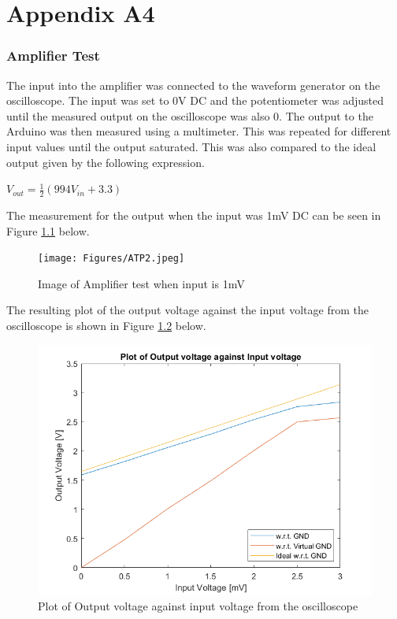 \documentclass[class=report,11pt,crop=false]{standalone}
\begin{document}
	\chapter{Appendix A4}
	\subsection{Amplifier Test}
	The input into the amplifier was connected to the waveform generator on the oscilloscope. The input was set to 0V DC and the potentiometer was adjusted until the measured output on the oscilloscope was also 0. The output to the Arduino was then measured using a multimeter. This was repeated for different input values until the output saturated. This was also compared to the ideal output given by the following expression.
	\begin{center}
		$V_{out}=\frac{1}{2}\left(994V_{in} + 3.3\right)$ \\
	\end{center}
	
	The measurement for the output when the input was 1mV DC can be seen in Figure \ref{fig:S8} below. 
	\begin{figure}[h!]
		\centering
		\texttt{[image: Figures/ATP2.jpeg]}
		\caption{Image of Amplifier test when input is 1mV}
		\label{fig:S8}
	\end{figure}
	
	The resulting plot of the output voltage against the input voltage from the oscilloscope is shown in Figure \ref{fig:S11} below.
	\begin{figure}[h!]
		\centering
		\includegraphics[width=0.4\linewidth]{Figures/Result1.png}
		\caption{Plot of Output voltage against input voltage from the oscilloscope}
		\label{fig:S11}
	\end{figure}
	\ifstandalone
	
	\printnoidxglossary[type=\acronymtype,nonumberlist]
	\fi
\end{document}
